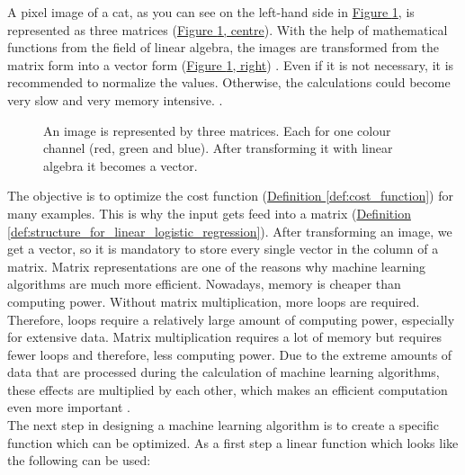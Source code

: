 A pixel image of a cat, as you can see on the left-hand side in \hyperref[fig:07_image_vector_representation.png]{Figure \ref{fig:07_image_vector_representation.png}}, is represented as three matrices (\hyperref[fig:07_image_vector_representation.png]{Figure \ref{fig:07_image_vector_representation.png}, centre}). With the help of mathematical functions from the field of linear algebra, the images are transformed from the matrix form into a vector form (\hyperref[fig:07_image_vector_representation.png]{Figure \ref{fig:07_image_vector_representation.png}, right}) \cite[p. 276]{brownlee2019deep}. Even if it is not necessary, it is recommended to normalize the values. Otherwise, the calculations could become very slow and very memory intensive. \cite[p. 57]{Goodfellow-et-al-2016}.

\begin{figure}[htp]
	\caption{An image is represented by three matrices. Each for one colour channel (red, green and blue). After transforming it with linear algebra it becomes a vector.}
	\label{fig:07_image_vector_representation.png}
\end{figure}

The objective is to optimize the cost function (\hyperref[def:cost_function]{Definition \ref{def:cost_function}}) for many examples. This is why the input gets feed into a matrix (\hyperref[def:structure_for_linear_logistic_regression]{Definition \ref{def:structure_for_linear_logistic_regression}}). After transforming an image, we get a vector, so it is mandatory to store every single vector in the column of a matrix. Matrix representations are one of the reasons why machine learning algorithms are much more efficient. Nowadays, memory is cheaper than computing power. Without matrix multiplication, more loops are required. Therefore, loops require a relatively large amount of computing power, especially for extensive data. Matrix multiplication requires a lot of memory but requires fewer loops and therefore, less computing power. Due to the extreme amounts of data that are processed during the calculation of machine learning algorithms, these effects are multiplied by each other, which makes an efficient computation even more important \cite{AndrewNG}.\\

The next step in designing a machine learning algorithm is to create a specific function which can be optimized. As a first step  a linear function which looks like the following can be used:

